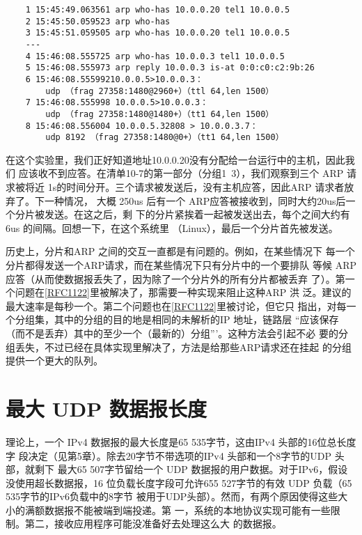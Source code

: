 \begin{verbatim}
    1 15:45:49.063561 arp who-has 10.0.0.20 tel1 10.0.0.5
    2 15:45:50.059523 arp who-has
    3 15:45:51.059505 arp who-has 10.0.0.20 tel1 10.0.0.5
    ---
    4 15:46:08.555725 arp who-has 10.0.0.3 tel1 10.0.0.5
    5 15:46:08.555973 arp reply 10.0.0.3 is-at 0:0:c0:c2:9b:26
    6 15:46:08.55599210.0.0.5>10.0.0.3：
        udp （frag 27358:1480@2960+）（ttl 64,len 1500）
    7 15:46:08.555998 10.0.0.5>10.0.0.3：
        udp （frag 27358:1480@1480+）（tt1 64,len 1500）
    8 15:46:08.556004 10.0.0.5.32808 > 10.0.0.3.7：
        udp 8192 （frag 27358:1480@0+）（tt1 64,len 1500）
\end{verbatim}

在这个实验里，我们正好知道地址10.0.0.20没有分配给一台运行中的主机，因此我们
应该收不到应答。在清单10-7的第一部分（分组1~3），我们观察到三个 ARP 请求被将近
1s的时间分开。三个请求被发送后，没有主机应答，因此ARP 请求者放弃了。下一种情况，
大概 250us 后有一个 ARP应答被接收到，同时大约20us后一个分片被发送。在这之后，剩
下的分片紧挨着一起被发送出去，每个之间大约有6us 的间隔。回想一下，在这个系统里
（Linux），最后一个分片首先被发送。

\begin{tcolorbox}
  历史上，分片和ARP 之间的交互一直都是有问题的。例如，在某些情况下
  每一个分片都得发送一个ARP请求，而在某些情况下只有分片中的一个要排队
  等候 ARP应答（从而使数据报丢失了，因为除了一个分片外的所有分片都被丢弃
  了）。第一个问题在\href{https://www.rfc-editor.org/rfc/rfc1122}{[RFC1122]}里被解决了，那需要一种实现来阻止这种ARP
  洪
  泛。建议的最大速率是每秒一个。第二个问题也在\href{https://www.rfc-editor.org/rfc/rfc1122}{[RFC1122]}里被讨论，但它只
  指出，对每一个分组集，其中的分组的目的地是相同的未解析的IP 地址，链路层
  “应该保存（而不是丢弃）其中的至少一个（最新的）分组”’。这种方法会引起不必
  要的分组丢失，不过已经在具体实现里解决了，方法是给那些ARP请求还在挂起
  的分组提供一个更大的队列。
\end{tcolorbox}

\section{最大 UDP 数据报长度}
理论上，一个 IPv4 数据报的最大长度是65 535字节，这由IPv4 头部的16位总长度字
段决定（见第5章）。除去20字节不带选项的IPv4 头部和一个8字节的UDP 头部，就剩下
最大65 507字节留给一个 UDP 数据报的用户数据。对于IPv6，假设没使用超长数据报，16
位负载长度字段可允许655 527字节的有效 UDP 负载（65 535字节的IPv6负载中的8字节
被用于UDP头部）。然而，有两个原因使得这些大小的满额数据报不能被端到端投递。第
一，系统的本地协议实现可能有一些限制。第二，接收应用程序可能没准备好去处理这么大
的数据报。

